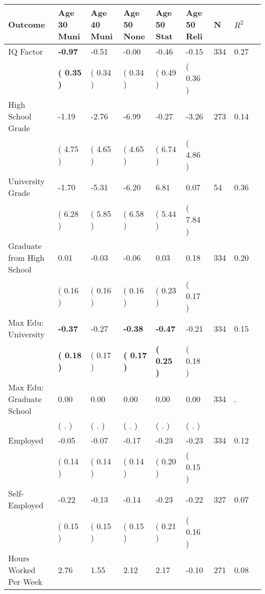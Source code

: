 \begin{tabular}{L{6.2cm} C{1.8cm} C{1.8cm} C{1.8cm} C{1.8cm} C{1.8cm} C{1.8cm} C{0.3cm} C{0.3cm}}
\toprule
 \textbf{Outcome} & \textbf{Age 30 Muni} & \textbf{Age 40 Muni} & \textbf{Age 50 None} & \textbf{Age 50 Stat} & \textbf{Age 50 Reli} & \textbf{N} & \textbf{$ R^2$} \\
\midrule
IQ Factor & \textbf{    -0.97} &     -0.51 &     -0.00 &     -0.46 &     -0.15  & 334 &       0.27 \\ 
 & \textbf{(     0.35 )} & (     0.34 ) & (     0.34 ) & (     0.49 ) & (     0.36 )  & \\
High School Grade &     -1.19 &     -2.76 &     -6.99 &     -0.27 &     -3.26  & 273 &       0.14 \\ 
 & (     4.75 ) & (     4.65 ) & (     4.65 ) & (     6.74 ) & (     4.86 )  & \\
University Grade &     -1.70 &     -5.31 &     -6.20 &      6.81 &      0.07  & 54 &       0.36 \\ 
 & (     6.28 ) & (     5.85 ) & (     6.58 ) & (     5.44 ) & (     7.84 )  & \\
Graduate from High School &      0.01 &     -0.03 &     -0.06 &      0.03 &      0.18  & 334 &       0.20 \\ 
 & (     0.16 ) & (     0.16 ) & (     0.16 ) & (     0.23 ) & (     0.17 )  & \\
Max Edu: University & \textbf{    -0.37} &     -0.27 & \textbf{    -0.38} & \textbf{    -0.47} &     -0.21  & 334 &       0.15 \\ 
 & \textbf{(     0.18 )} & (     0.17 ) & \textbf{(     0.17 )} & \textbf{(     0.25 )} & (     0.18 )  & \\
Max Edu: Graduate School &      0.00 &      0.00 &      0.00 &      0.00 &      0.00  & 334 &          . \\ 
 & (        . ) & (        . ) & (        . ) & (        . ) & (        . )  & \\
Employed &     -0.05 &     -0.07 &     -0.17 &     -0.23 &     -0.23  & 334 &       0.12 \\ 
 & (     0.14 ) & (     0.14 ) & (     0.14 ) & (     0.20 ) & (     0.15 )  & \\
Self-Employed &     -0.22 &     -0.13 &     -0.14 &     -0.23 &     -0.22  & 327 &       0.07 \\ 
 & (     0.15 ) & (     0.15 ) & (     0.15 ) & (     0.21 ) & (     0.16 )  & \\
Hours Worked Per Week &      2.76 &      1.55 &      2.12 &      2.17 &     -0.10  & 271 &       0.08 \\ 

\end{tabular}
